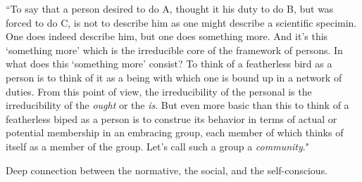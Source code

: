 ``To say that a person desired to do A, thought it his duty to do B, but was forced to do C, is not to describe him as one might describe a scientific specimin. One does indeed describe him, but one does something more. And it's this `something more' which is the irreducible core of the framework of persons. In what does this `something more' consist? To think of a featherless bird as a person is to think of it as a being with which  one is bound up in a network of duties. From this point of view, the irreducibility of the personal is the irreducibility of the \emph{ought} or the \emph{is}. But even more basic than this to think of a featherless biped as a person is to construe its behavior in terms of actual or potential membership in an embracing group, each member of which thinks of itself as a member of the group. Let's call such a group a \emph{community}."

Deep connection between the normative, the social, and the self-conscious.